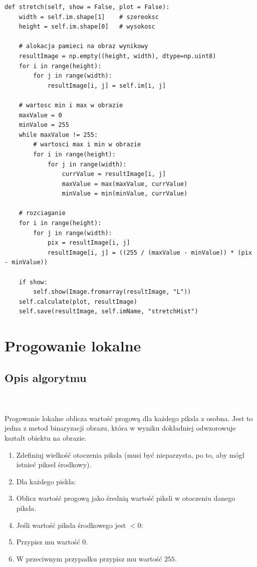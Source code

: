 \documentclass[final,a4paper,openany,12pt]{mwbk}
\begin{document}

\begin{lstlisting}[caption=Rozciąganie histogramu]
def stretch(self, show = False, plot = False):
	width = self.im.shape[1]    # szereoksc
	height = self.im.shape[0]   # wysokosc
	
	# alokacja pamieci na obraz wynikowy
	resultImage = np.empty((height, width), dtype=np.uint8)
	for i in range(height):
		for j in range(width):
			resultImage[i, j] = self.im[i, j]
	
	# wartosc min i max w obrazie
	maxValue = 0
	minValue = 255
	while maxValue != 255:
		# wartosci max i min w obrazie
		for i in range(height):
			for j in range(width):
				currValue = resultImage[i, j]
				maxValue = max(maxValue, currValue)
				minValue = min(minValue, currValue)
	
	# rozciaganie
	for i in range(height):
		for j in range(width):
			pix = resultImage[i, j]
			resultImage[i, j] = ((255 / (maxValue - minValue)) * (pix - minValue))
	
	if show:
		self.show(Image.fromarray(resultImage, "L"))
	self.calculate(plot, resultImage)
	self.save(resultImage, self.imName, "stretchHist")
\end{lstlisting}

\newpage





\section{Progowanie lokalne}
\subsection*{Opis algorytmu}
\hfill
\\\\
\indent Progowanie lokalne oblicza wartość progową dla każdego piksla z osobna. Jest to jedna z metod binaryzacji obrazu, która w wyniku dokładniej odwzorowuje kształt obiektu na obrazie.
\begin{enumerate}
	\item Zdefiniuj wielkość otoczenia piksla (musi być nieparzysta, po to, aby mógł istnieć piksel środkowy).
	\item Dla każdego piskla:
	\item Oblicz wartość progową jako średnią wartość piksli w otoczeniu danego piksla.
	\item Jeśli wartość piksla środkowego jest $< 0$:
	\item Przypisz mu wartość $0$.
	\item W przeciwnym przypadku przypisz mu wartość $255$.
\end{enumerate}
\end{document}
